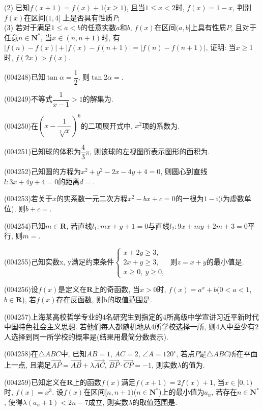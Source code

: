 (2) 已知$f(x+1)=f(x)+1$($x\ge 1$), 且当$1\le x<2$时, $f(x)=1-x$, 判别$f(x)$在区间$(1,4]$ 上是否具有性质$P$;\\
(3) 若对于满足$1\le a<b$的任意实数$a$和$b$, $f(x)$在区间$(a,b]$上具有性质$P$, 且对于任意$n\in \mathbf{N}^*$, 当$x\in (n,n+1)$时, 有$|f(n)-f(x)|+|f(x)-f(n+1)|=|f(n)-f(n+1)|$, 证明: 当$x\ge 1$时, $f(2x)>f(x)$.
\item (004248)已知$\tan \alpha =\dfrac 12$, 则$\tan 2\alpha =$.
\item (004249)不等式$\dfrac 1{x-1}>1$的解集为.
\item (004250)在$(x-\dfrac 1{\sqrt[3]x})^6$的二项展开式中, $x^2$项的系数为.
\item (004251)已知球的体积为$\dfrac 43\pi$, 则该球的左视图所表示图形的面积为.
\item (004252)己知圆的方程为$x^2+y^2-2x-4y+4=0$, 则圆心到直线$l:3x+4y+4=0$的距离$d=$.
\item (004253)若关于$x$的实系数一元二次方程$x^2-bx+c=0$的一根为$1-\mathrm{i}$($\mathrm{i}$为虚数单位), 则$b+c=$.
\item (004254)已知$m\in \mathbf{R}$, 若直线$l_1:mx+y+1=0$与直线$l_2:9x+my+2m+3=0$平行, 则$m=$.
\item (004255)己知实数x, y满足约束条件$\begin{cases} x+2y\ge 3, \\ 2x+y\ge 3, \\ x\ge 0, \ y\ge 0, \end{cases}$ 则$z=x+y$的最小值是.
\item (004256)设$f(x)$是定义在$\mathbf{R}$上的奇函数, 当$x>0$时, $f(x)=a^x+b$($0<a<1$, $b\in \mathbf{R}$), 若$f(x)$存在反函数, 则b的取值范围是.
\item (004257)上海某高校哲学专业的$4$名研究生到指定的4所高级中学宣讲习近平新时代中国特色社会主义思想. 若他们每人都随机地从$4$所学校选择一所, 则$4$人中至少有$2$人选择到同一所学校的概率是(结果用最简分数表示).
\item (004258)在$\triangle ABC$中, 已知$AB=1$, $AC=2$, $\angle A=120^\circ$, 若点$P$是$\triangle ABC$所在平面上一点, 且满足$\overrightarrow{AP}=\overrightarrow{AB}+\lambda \overrightarrow{AC}$, $\overrightarrow{BP}\cdot \overrightarrow{CP}=-1$, 则实数$\lambda$的值为.
\item (004259)已知定义在$\mathbf{R}$上的函数$f(x)$满足$f(x+1)=2f(x)+1$, 当$x\in [0,1)$时, $f(x)=x^3$. 设$f(x)$在区间$[n,n+1)$($n\in \mathbf{N}^*$)上的最小值为$a_n$, 若存在$n\in \mathbf{N}^*$, 使得$\lambda (a_n+1)<2n-7$成立, 则实数$\lambda$的取值范围是.
